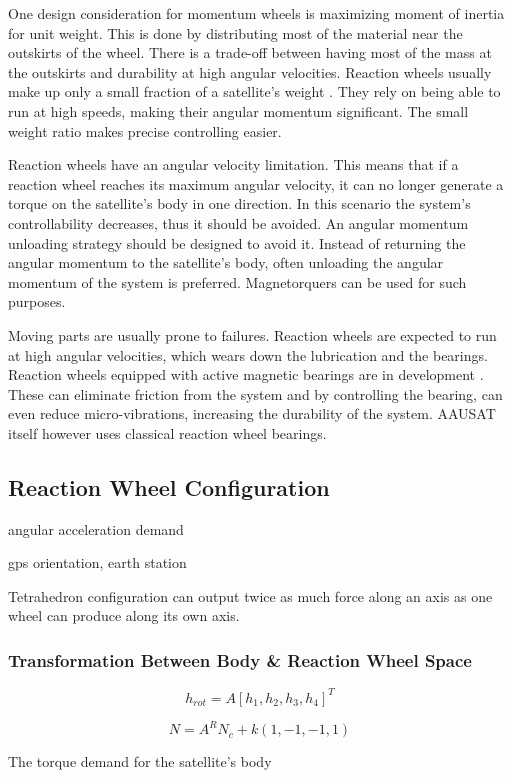 One design consideration for momentum wheels is maximizing moment of inertia for unit weight. This is done by distributing most of the material near the outskirts of the wheel. There is a trade-off between having most of the mass at the outskirts and durability at high angular velocities. 
Reaction wheels usually make up only a small fraction of a satellite's weight . They rely on being able to run at high speeds, making their angular momentum significant. The small weight ratio makes precise controlling easier.

Reaction wheels have an angular velocity limitation. This means that if a reaction wheel reaches its maximum angular velocity, it can no longer generate a torque on the satellite's body in one direction. In this scenario the system's controllability decreases, thus it should be avoided. An angular momentum unloading strategy should be designed to avoid it. Instead of returning the angular momentum to the satellite's body, often unloading the angular momentum of the system is preferred. Magnetorquers can be used for such purposes.

Moving parts are usually prone to failures. Reaction wheels are expected to run at high angular velocities, which wears down the lubrication and the bearings. Reaction wheels equipped with active magnetic bearings are in development \cite{GERLACH2006572}. These can eliminate friction from the system and by controlling the bearing, can even reduce micro-vibrations, increasing the durability of the system. AAUSAT  itself however uses classical reaction wheel bearings.

\subsection{Reaction Wheel Configuration}

angular acceleration demand \cite{ReactionWheelConfigSim} \cite{ReactConfigThesis}

gps orientation, earth station

Tetrahedron configuration can output twice as much force along an axis as one wheel can produce along its own axis.

\subsubsection{Transformation Between Body \& Reaction Wheel Space}

\cite[equation 18.41-42]{SADC}

\begin{equation}
h_{rot} = A\left[ h_1, h_2, h_3, h_4 \right]^T
\end{equation}

\begin{equation}
N = A^R \textbf{$N_c$} + k\left(1,-1,-1,1\right)
\end{equation}


The torque demand for the satellite's body

